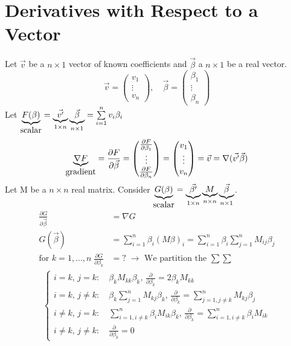 \section{Derivatives with Respect to a Vector}\label{app:der}
Let $\vec{v}$ be a $n\times 1$ vector of known coefficients and $\vec{\beta}$ a $n\times 1$ be a real vector.
\begin{equation*}
	\vec{v}=
	\begin{pmatrix}
		v_1\\
		\vdots\\
		v_n
	\end{pmatrix},\quad	\vec{\beta}=
	\begin{pmatrix}
		\beta_1\\
		\vdots\\
		\beta_n	
	\end{pmatrix}
\end{equation*}
Let $\underbrace{F(\beta)}_{\hbox{scalar}}=\underbrace{\vec{v'}}_{1\times n} \underbrace{\vec{\beta}}_{n\times 1}=\sum\limits_{i=1}^n v_i \beta_i$
\begin{equation*}
	\underbrace{\nabla F}_{\hbox{gradient}}=\frac{\partial F}{\partial \vec{\beta}}=
	\begin{pmatrix}
	\frac{\partial F}{\partial \beta_1}\\
	\vdots\\
	\frac{\partial F}{\partial \beta_n}
	\end{pmatrix}=
	\begin{pmatrix}
	v_1\\
	\vdots\\
	v_n
	\end{pmatrix}=\vec{v}=\nabla(\vec{v'} \vec{\beta})
\end{equation*}
Let M be a $n\times n$ real matrix. Consider $\underbrace{G(\beta)}_{\hbox{scalar}}=\underbrace{\vec{\beta'}}_{1\times n} \underbrace{M}_{n\times n} \underbrace{\vec{\beta}}_{n\times 1}$.	
\begin{align*}
	\frac{\partial G}{\partial \vec{\beta}}&=\nabla G\\
	G(\vec{\beta})&=\sum\limits_{i=1}^n \beta_i (M  \beta)_i = \sum\limits_{i=1}^n \beta_i \sum\limits_{j=1}^n M_{ij}\beta_j\\
	\text{for }k=1,...,n\;\frac{\partial G}{\partial \beta_k}&=?\;\longrightarrow\text{ We partition the }\sum\sum
	\end{align*}	
	\begin{align*}
	\begin{cases}
		i=k,\, j=k:\quad\beta_k  M_{kk}  \beta_k,\,\frac{\partial}{\partial \beta_k}=2\beta_k   M_{kk}\\
		i=k,\, j\neq k:\quad\beta_k \sum\limits_{j=1}^n M_{kj} \beta_k,\,\frac{\partial}{\partial \beta_k}=\sum\limits_{j=1,j\neq k}^n M_{kj} \beta_j\\
		i\neq k,\, j=k:\quad\sum\limits_{i=1,i\neq k}^n \beta_i  M_{ik} \beta_k,\,\frac{\partial}{\partial \beta_k}=\sum\limits_{i=1,i\neq k}^n \beta_i  M_{ik}\\
	i\neq k,\, j\neq k:\quad\frac{\partial}{\partial \beta_k}=0
	\end{cases}
\end{align*}
